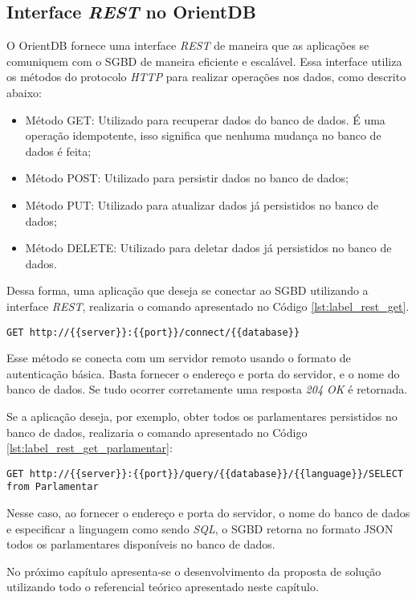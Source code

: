 \subsection{Interface \textit{REST} no OrientDB} \label{rest_orient_db}
	O OrientDB fornece uma interface \textit{REST} de maneira que as aplicações se comuniquem com o SGBD de maneira eficiente e escalável. Essa interface utiliza os métodos do protocolo \textit{HTTP} para realizar operações nos dados, como descrito abaixo:
	
\begin{itemize}
	\item Método GET: Utilizado para recuperar dados do banco de dados. É uma operação idempotente, isso significa que nenhuma mudança no banco de dados é feita;
	\item Método POST: Utilizado para persistir dados no banco de dados;
	\item Método PUT: Utilizado para atualizar dados já persistidos no banco de dados;
	\item Método DELETE: Utilizado para deletar dados já persistidos no banco de dados.
\end{itemize}

	Dessa forma, uma aplicação que deseja se conectar ao SGBD utilizando a interface \textit{REST}, realizaria o comando apresentado no Código \ref{lst:label_rest_get}. 
	
\begin{lstlisting}[label={lst:label_rest_get}, caption={Exemplo de Conexão com o OrientDB Utilizando o Protocolo HTTP.},captionpos=b]
GET http://{{server}}:{{port}}/connect/{{database}}
\end{lstlisting}

	Esse método se conecta com um servidor remoto usando o formato de autenticação básica. Basta fornecer o endereço e porta do servidor, e o nome do banco de dados. Se tudo ocorrer corretamente uma resposta \textit{204 OK} é retornada.
	
	Se a aplicação deseja, por exemplo, obter todos os parlamentares persistidos no banco de dados,  realizaria o comando apresentado no Código \ref{lst:label_rest_get_parlamentar}:
	
\begin{lstlisting}[label={lst:label_rest_get_parlamentar}, caption={Exemplo de Consulta no OrientDB Utilizando o Protocolo HTTP.},captionpos=b]
GET http://{{server}}:{{port}}/query/{{database}}/{{language}}/SELECT 
from Parlamentar
\end{lstlisting}

	Nesse caso, ao fornecer o endereço e porta do servidor, o nome do banco de dados e especificar a linguagem como sendo \textit{SQL}, o SGBD retorna no formato JSON todos os parlamentares disponíveis no banco de dados.
	
No próximo capítulo apresenta-se o desenvolvimento da proposta de solução utilizando todo o referencial teórico apresentado neste capítulo.
